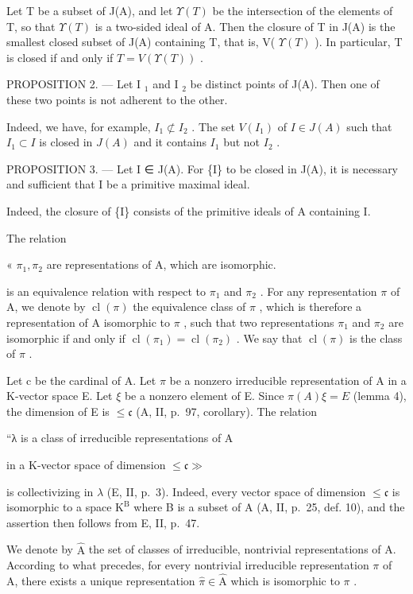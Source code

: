 Let T be a subset of J(A), and let \(\Upsilon(T)\) be the intersection of the elements of T, so that \(\Upsilon(T)\) is a two-sided ideal of A. Then the closure of T in J(A) is the smallest closed subset of J(A) containing T, that is, V( \(\Upsilon(T)\) ). In particular, T is closed if and only if \(T = V(\Upsilon(T))\) .

PROPOSITION 2. --- Let I \(_{1}\) and I \(_{2}\) be distinct points of J(A). Then one of these two points is not adherent to the other.

Indeed, we have, for example, \(I_{1} \not\subset I_{2}\) . The set \(V(I_{1})\) of \(I \in J(A)\) such that \(I_{1} \subset I\) is closed in \(J(A)\) and it contains \(I_{1}\) but not \(I_{2}\) .

PROPOSITION 3. --- Let I ∈ J(A). For \{I\} to be closed in J(A), it is necessary and sufficient that I be a primitive maximal ideal.

Indeed, the closure of \{I\} consists of the primitive ideals of A containing I.

The relation

« \(\pi_{1},\pi_{2}\) are representations of A, which are isomorphic.

is an equivalence relation with respect to \(\pi_1\) and \(\pi_2\) . For any representation \(\pi\) of A, we denote by \(\operatorname{cl}(\pi)\) the equivalence class of \(\pi\) , which is therefore a representation of A isomorphic to \(\pi\) , such that two representations \(\pi_1\) and \(\pi_2\) are isomorphic if and only if \(\operatorname{cl}(\pi_1) = \operatorname{cl}(\pi_2)\) . We say that \(\operatorname{cl}(\pi)\) is the class of \(\pi\) .

Let c be the cardinal of A. Let \(\pi\) be a nonzero irreducible representation of A in a K-vector space E. Let \(\xi\) be a nonzero element of E. Since \(\pi(A)\xi = E\) (lemma 4), the dimension of E is \(\leqslant\mathfrak{c}\) (A, II, p.~97, corollary). The relation

“λ is a class of irreducible representations of A

in a K-vector space of dimension \(\leqslant\mathfrak{c}\gg\)

is collectivizing in \(\lambda\) (E, II, p.~3). Indeed, every vector space of dimension \(\leqslant \mathfrak{c}\) is isomorphic to a space \(\mathrm{K}^{\mathrm{B}}\) where B is a subset of A (A, II, p.~25, def. 10), and the assertion then follows from E, II, p.~47.

We denote by \(\widehat{\mathrm{A}}\) the set of classes of irreducible, nontrivial representations of A. According to what precedes, for every nontrivial irreducible representation \(\pi\) of A, there exists a unique representation \(\widehat{\pi} \in \widehat{\mathrm{A}}\) which is isomorphic to \(\pi\) .

